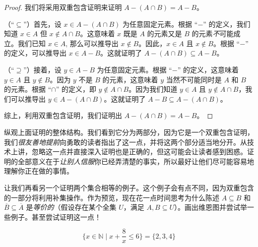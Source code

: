 \begin{proof}
    我们将采用双重包含证明来证明 $A - (A \cap B) = A - B$。

    （``$\subseteq$''）首先，设 $x \in A - (A \cap B)$ 为任意固定元素。根据 ``$-$'' 的定义，我们知道 $x \in A$ 但 $x \notin A \cap B$。这意味着 $x$ 既是 $A$ 的元素又是 $B$ 的元素\emph{不}可能成立。我们已知 $x \in A$, 那么可以推导出 $x \notin B$。因此，$x \in A$ 且 $x \notin B$。根据 ``$-$'' 的定义，可以推导出 $x \in A-B$。这就证明了 $A - (A \cap B) \subseteq A - B$。


    （``$\supseteq$''）接着，设 $y \in A - B$ 为任意固定元素。根据 ``$-$'' 的定义，这意味着 $y \in A$ 且 $y \notin B$。因为 $y$ 不是 $B$ 的元素，这意味着 $y$ 当然不可能同时是 $A$ 和 $B$ 的元素。根据 ``$\cap$'' 的定义，即 $y \notin A \cap B$。因为我们知道 $y \in A$ 且 $y \notin A \cap B$，我们可以推导出 $y \in A - (A \cap B)$。这就证明了 $A - B \subseteq A - (A \cap B)$。

    综上，利用双重包含证明，我们证明出 $A - (A \cap B) = A - B$。
\end{proof}

纵观上面证明的整体结构。我们看到它分为两部分，因为它是一个双重包含证明，我们\emph{很友善地提前}向勇敢的读者指出了这一点，并将这两个部分适当地分开。从技术上讲，忽略这一点并直接深入证明也是正确的，但这可能会让读者感到困惑。证明的全部意义在于\emph{让别人信服}你已经弄清楚的事实，所以最好让他们尽可能容易地理解你正在做的事情。

让我们再看另一个证明两个集合相等的例子。这个例子会有点不同，因为双重包含的一部分将利用补集操作。作为预览，现在花一点时间思考为什么陈述 $A \subseteq B$ 和 $\overline{B} \subseteq \overline{A}$ 是\emph{等价的}（假设存在某个全集 $U$，满足 $A, B \subseteq U$）。画出维恩图并尝试举一些例子。甚至尝试证明这一点！

\begin{proposition}
    \[\Big\{x \in \mathbb{N} \mid x + \frac{8}{x} \le 6\Big\} = \{2, 3, 4\}\]
\end{proposition}

